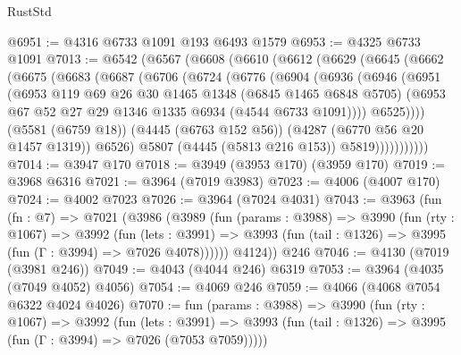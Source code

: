 \begin{lexlean}{RustStd}
\begin{coremodule}
{\begin{coremodule}
{{{{{{{{{{{{{{{{{{{{{{{{{{{{{{{{{{{{{{@6951 := @4316 @6733 @1091 @193 @6493 @1579
@6953 := @4325 @6733 @1091
@7013 := @6542
    (@6567
      (@6608
        (@6610
          (@6612
            (@6629
              (@6645
                (@6662
                  (@6675
                    (@6683
                      (@6687
                        (@6706
                          (@6724
                            (@6776
                              (@6904
                                (@6936
                                  (@6946
                                    (@6951
                                      (@6953
                                        @119
                                        @69
                                        @26
                                        @30
                                        @1465
                                        @1348
                                        (@6845 @1465 @6848 @5705)
                                        (@6953
                                          @67
                                          @52
                                          @27
                                          @29
                                          @1346
                                          @1335
                                          @6934
                                          (@4544 @6733 @1091))))
                                    @6525))))
                            (@5581 (@6759 @18))
                            (@4445 (@6763 @152 @56))
                            (@4287 (@6770 @56 @20 @1457 @1319))
                            @6526)
                          @5807
                          (@4445 (@5813 @216 @153))
                          @5819)))))))))))
@7014 := @3947 @170
@7018 := @3949 (@3953 @170) (@3959 @170)
@7019 := @3968 @6316
@7021 := @3964 (@7019 @3983)
@7023 := @4006 (@4007 @170)
@7024 := @4002 @7023
@7026 := @3964 (@7024 @4031)
@7043 := @3963
    (fun (fn : @7) =>
    @7021
      (@3986
        (@3989
          (fun (params : @3988) =>
          @3990
            (fun (rty : @1067) =>
            @3992
              (fun (lets : @3991) =>
              @3993 (fun (tail : @1326) => @3995 (fun (Γ : @3994) => @7026 @4078))))))
        @4124))
    @246
@7046 := @4130 (@7019 (@3981 @246))
@7049 := @4043 (@4044 @246) @6319
@7053 := @3964 (@4035 (@7049 @4052) @4056)
@7054 := @4069 @246
@7059 := @4066 (@4068 @7054 @6322 @4024 @4026)
@7070 := fun (params : @3988) =>
  @3990
    (fun (rty : @1067) =>
    @3992
      (fun (lets : @3991) =>
      @3993 (fun (tail : @1326) => @3995 (fun (Γ : @3994) => @7026 (@7053 @7059)))))
}}}}}}}}}}}}}}}}}}}}}}}}}}}}}}}}}}}}}}
\end{coremodule}}
\end{coremodule}
\end{lexlean}
